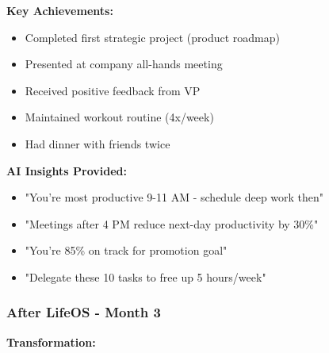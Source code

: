 \textbf{Key Achievements:}
\begin{itemize}
    \item Completed first strategic project (product roadmap)
    \item Presented at company all-hands meeting
    \item Received positive feedback from VP
    \item Maintained workout routine (4x/week)
    \item Had dinner with friends twice
\end{itemize}

\textbf{AI Insights Provided:}
\begin{itemize}
    \item "You're most productive 9-11 AM - schedule deep work then"
    \item "Meetings after 4 PM reduce next-day productivity by 30\%"
    \item "You're 85\% on track for promotion goal"
    \item "Delegate these 10 tasks to free up 5 hours/week"
\end{itemize}

\subsubsection{After LifeOS - Month 3}

\textbf{Transformation:}

